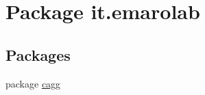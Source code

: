 \hypertarget{namespaceit_1_1emarolab}{\section{Package it.\-emarolab}
\label{namespaceit_1_1emarolab}
}
\subsection*{Packages}
\begin{DoxyCompactItemize}
\item 
package \hyperlink{namespaceit_1_1emarolab_1_1cagg}{cagg}
\end{DoxyCompactItemize}
